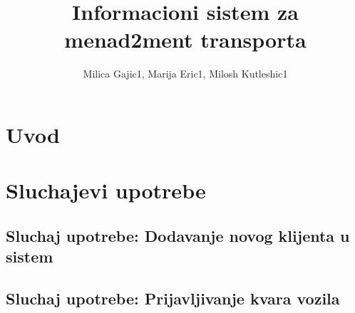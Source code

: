 \documentclass{article}
\title{Informacioni sistem za menad2ment transporta}
\author{Milica Gajic1, Marija Eric1, Milosh Kutleshic1}
\begin{document}
\maketitle
\newpage


\renewcommand*\contentsname{Sadrz1aj}
\tableofcontents
\newpage

\section{Uvod}

\section{Sluchajevi upotrebe}
\subsection{Sluchaj upotrebe: Dodavanje novog klijenta u sistem}


\subsection{Sluchaj upotrebe: Prijavljivanje kvara vozila}



\nocite{*}


\end{document}
